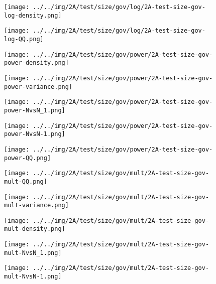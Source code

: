 \begin{figure}[H]
\centering	\texttt{[image: ../../img/2A/test/size/gov/log/2A-test-size-gov-log-density.png]}
\end{figure}
\begin{figure}[H]
\centering	\texttt{[image: ../../img/2A/test/size/gov/log/2A-test-size-gov-log-QQ.png]}
\end{figure}
\begin{figure}[H]
\centering	\texttt{[image: ../../img/2A/test/size/gov/power/2A-test-size-gov-power-density.png]}
\end{figure}
\begin{figure}[H]
\centering	\texttt{[image: ../../img/2A/test/size/gov/power/2A-test-size-gov-power-variance.png]}
\end{figure}
\begin{figure}[H]
\centering	\texttt{[image: ../../img/2A/test/size/gov/power/2A-test-size-gov-power-NvsN\_1.png]}
\end{figure}
\begin{figure}[H]
\centering	\texttt{[image: ../../img/2A/test/size/gov/power/2A-test-size-gov-power-NvsN-1.png]}
\end{figure}
\begin{figure}[H]
\centering	\texttt{[image: ../../img/2A/test/size/gov/power/2A-test-size-gov-power-QQ.png]}
\end{figure}
\begin{figure}[H]
\centering	\texttt{[image: ../../img/2A/test/size/gov/mult/2A-test-size-gov-mult-QQ.png]}
\end{figure}
\begin{figure}[H]
\centering	\texttt{[image: ../../img/2A/test/size/gov/mult/2A-test-size-gov-mult-variance.png]}
\end{figure}
\begin{figure}[H]
\centering	\texttt{[image: ../../img/2A/test/size/gov/mult/2A-test-size-gov-mult-density.png]}
\end{figure}
\begin{figure}[H]
\centering	\texttt{[image: ../../img/2A/test/size/gov/mult/2A-test-size-gov-mult-NvsN\_1.png]}
\end{figure}
\begin{figure}[H]
\centering	\texttt{[image: ../../img/2A/test/size/gov/mult/2A-test-size-gov-mult-NvsN-1.png]}
\end{figure}
